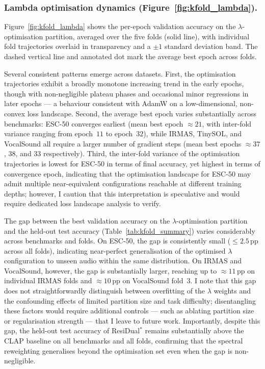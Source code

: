 \subsubsection{Lambda optimisation dynamics (Figure~\ref{fig:kfold_lambda}).}
Figure~\ref{fig:kfold_lambda} shows the per-epoch validation accuracy on the 
$\lambda$-optimisation partition, averaged over the five folds (solid line), 
with individual fold trajectories overlaid in transparency and a $\pm 1$ standard 
deviation band. The dashed vertical line and annotated dot mark the average best epoch 
across folds.

Several consistent patterns emerge across datasets.
First, the optimisation trajectories exhibit a broadly monotone increasing trend
in the early epochs, though with non-negligible plateau phases and occasional
minor regressions in later epochs --- a behaviour consistent with AdamW on a
low-dimensional, non-convex loss landscape.
Second, the average best epoch varies substantially across benchmarks:
ESC-50 converges earliest (mean best epoch $\approx 21$, with inter-fold variance
ranging from epoch~$11$ to epoch~$32$), while IRMAS, TinySOL, and VocalSound
all require a larger number of gradient steps (mean best epochs $\approx 37$,
$38$, and $33$ respectively).
Third, the inter-fold variance of the optimisation trajectories is lowest for
ESC-50 in terms of final accuracy, yet highest in terms of convergence epoch,
indicating that the optimisation landscape for ESC-50 may admit multiple
near-equivalent configurations reachable at different training depths; however,
I caution that this interpretation is speculative and would require dedicated
loss landscape analysis to verify.

The gap between the best validation accuracy on the $\lambda$-optimisation
partition and the held-out test accuracy (Table~\ref{tab:kfold_summary})
varies considerably across benchmarks and folds.
On ESC-50, the gap is consistently small ($\le 2.5$\,pp across all folds),
indicating near-perfect generalisation of the optimised $\lambda$ configuration
to unseen audio within the same distribution.
On IRMAS and VocalSound, however, the gap is substantially larger, reaching
up to $\approx 11$\,pp on individual IRMAS folds and $\approx 10$\,pp on
VocalSound fold~3.
I note that this gap does not straightforwardly distinguish between overfitting
of the $\lambda$ weights and the confounding effects of limited partition size
and task difficulty; disentangling these factors would require additional
controls --- such as ablating partition size or regularisation strength ---
that I leave to future work.
Importantly, despite this gap, the held-out test accuracy of ResiDual$^*$\xspace
remains substantially above the CLAP baseline on all benchmarks and all folds,
confirming that the spectral reweighting generalises beyond the optimisation set
even when the gap is non-negligible.

